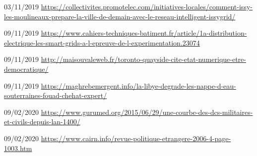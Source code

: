 03/11/2019
\url{https://collectivites.promotelec.com/initiatives-locales/comment-issy-les-moulineaux-prepare-la-ville-de-demain-avec-le-reseau-intelligent-issygrid/}

09/11/2019
\url{https://www.cahiers-techniques-batiment.fr/article/1a-distribution-electrique-les-smart-grids-a-l-epreuve-de-l-experimentation.23074}

09/11/2019
\url{http://maisouvaleweb.fr/toronto-quayside-cite-etat-numerique-etre-democratique/}

09/11/2019
\url{https://maghrebemergent.info/la-libye-degrade-les-nappe-d-eau-souterraines-fouad-chehat-expert/}

09/02/2020
\url{https://www.gurumed.org/2015/06/29/une-courbe-des-dcs-militaires-et-civils-depuis-lan-1400/}

09/02/2020
\url{https://www.cairn.info/revue-politique-etrangere-2006-4-page-1003.htm}
